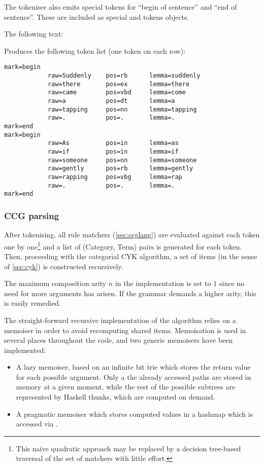 \documentclass[main.tex]{subfiles}
\begin{document}
The tokeniser also emits special tokens for ``begin of sentence'' and ``end of
sentence''. These are included as special  and 
tokens objects.

\begin{example}
    The following text:
    \begin{center}
    \end{center}

    Produces the following token list (one token on each row):
\begin{lstwrap}\begin{lstlisting}
mark=begin
            raw=Suddenly    pos=rb      lemma=suddenly
            raw=there       pos=ex      lemma=there
            raw=came        pos=vbd     lemma=come
            raw=a           pos=dt      lemma=a
            raw=tapping     pos=nn      lemma=tapping
            raw=.           pos=.       lemma=.
mark=end
mark=begin
            raw=As          pos=in      lemma=as
            raw=if          pos=in      lemma=if
            raw=someone     pos=nn      lemma=someone
            raw=gently      pos=rb      lemma=gently
            raw=rapping     pos=vbg     lemma=rap
            raw=.           pos=.       lemma=.
mark=end
\end{lstlisting}\end{lstwrap}
\end{example}

\subsubsection{CCG parsing}
After tokenising, all rule matchers (\cref{sec:ccglang}) are evaluated against
each token one by one\footnote{This naïve quadratic approach may be replaced
    by a decision tree-based traversal of the set of matchers with little
    effort.} and a list of (Category, Term) pairs is generated for each token.
Then, proceeding with the categorial CYK algorithm, a set of items (in the
sense of \cref{sec:cyk}) is constructed recursively.

The maximum composition arity $n$ in the implementation is set to $1$ since no need
for more arguments has arisen. If the grammar demands a higher arity, this
is easily remedied.

The straight-forward recursive implementation of the algorithm relies on a
memoiser in order to avoid recomputing shared items. Memoisation is used in
several places throughout the code, and two generic memoisers have been
implemented:
\begin{itemize}
    \item A lazy memoiser, based on an infinite bit trie which stores the return
        value for each possible argument. Only a the already accessed paths are
        stored in memory at a given moment, while the rest of the possible
        subtrees are represented by Haskell thunks, which are computed on
        demand.
    \item A pragmatic memoiser which stores computed values in a hashmap which
        is accessed via .
\end{itemize}
\end{document}
